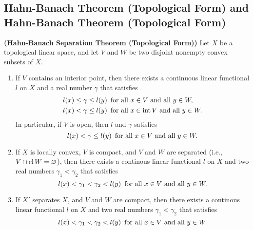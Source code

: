 \subsection{Hahn-Banach Theorem (Topological Form) and Hahn-Banach Theorem (Topological Form)}

\begin{theorem}{\bf (Hahn-Banach Separation Theorem (Topological Form))}
  Let $X$ be a topological linear space, and let $V$ and $W$ be two disjoint nonempty convex subsets of $X$.
  \begin{enumerate}
    \item If $V$ contains an interior point, then there exists a continuous linear functional $l$ on $X$ and a real number $\gamma$ that satisfies
    \begin{equation*}
      \begin{aligned}
        l(x)\leq\gamma\leq l(y)&\text{\enskip for all }x\in V\text{ and all }y\in W,\\
        l(x)<\gamma\leq l(y)&\text{\enskip for all }x\in \operatorname{int} V\text{ and all }y\in W.
      \end{aligned}
    \end{equation*}
    In particular, if $V$ is open, then $l$ and $\gamma$ satisfies
    \begin{equation*}
      l(x)<\gamma\leq l(y)\text{\enskip for all }x\in V\text{ and all }y\in W.
    \end{equation*}
    \item If $X$ is locally convex, $V$ is compact, and $V$ and $W$ are separated (i.e., $V\cap \operatorname{cl} W=\varnothing$), then there exists a continous linear functional $l$ on $X$ and two real numbers $\gamma_1<\gamma_2$ that satisfies
    \begin{equation*}
      l(x)<\gamma_1<\gamma_2 < l(y)\text{\enskip for all }x\in V\text{ and all }y\in W.
    \end{equation*}
    \item If $X'$ separates $X$, and $V$ and $W$ are compact, then there exists a continous linear functional $l$ on $X$ and two real numbers $\gamma_1<\gamma_2$ that satisfies
    \begin{equation*}
      l(x)<\gamma_1<\gamma_2 < l(y)\text{\enskip for all }x\in V\text{ and all }y\in W.
    \end{equation*}
  \end{enumerate}
\end{theorem}

